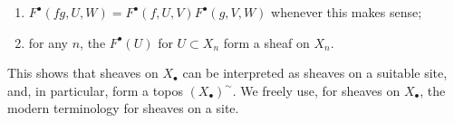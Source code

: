     
 \begin{enumerate}
      
 \item[(a)]
        \(F^\bullet (fg,U,W)=F^\bullet (f,U,V)F^\bullet (g,V,W)\) whenever this makes sense;
      

      
 \item[(b)]
        for any \(n\), the \(F^\bullet (U)\) for \(U\subset  X_n\) form a sheaf on \(X_n\).
      

    \end{enumerate}\label{hodge-theory-iii-5.1.8}\par{}This shows that sheaves on \(X_\bullet \) can be interpreted as sheaves on a suitable site, and, in particular, form a topos \((X_\bullet )^\sim \).
    We freely use, for sheaves on \(X_\bullet \), the modern terminology for sheaves on a site.
